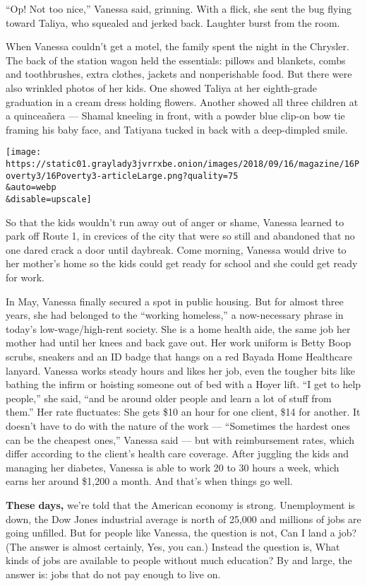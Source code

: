 ``Op! Not too nice,'' Vanessa said, grinning. With a flick, she sent the
bug flying toward Taliya, who squealed and jerked back. Laughter burst
from the room.

When Vanessa couldn't get a motel, the family spent the night in the
Chrysler. The back of the station wagon held the essentials: pillows and
blankets, combs and toothbrushes, extra clothes, jackets and
nonperishable food. But there were also wrinkled photos of her kids. One
showed Taliya at her eighth-grade graduation in a cream dress holding
flowers. Another showed all three children at a quinceañera --- Shamal
kneeling in front, with a powder blue clip-on bow tie framing his baby
face, and Tatiyana tucked in back with a deep-dimpled smile.

\texttt{[image: https://static01.graylady3jvrrxbe.onion/images/2018/09/16/magazine/16Poverty3/16Poverty3-articleLarge.png?quality=75\\\&auto=webp\\\&disable=upscale]}

So that the kids wouldn't run away out of anger or shame, Vanessa
learned to park off Route 1, in crevices of the city that were so still
and abandoned that no one dared crack a door until daybreak. Come
morning, Vanessa would drive to her mother's home so the kids could get
ready for school and she could get ready for work.

In May, Vanessa finally secured a spot in public housing. But for almost
three years, she had belonged to the ``working homeless,'' a
now-necessary phrase in today's low-wage/high-rent society. She is a
home health aide, the same job her mother had until her knees and back
gave out. Her work uniform is Betty Boop scrubs, sneakers and an ID
badge that hangs on a red Bayada Home Healthcare lanyard. Vanessa works
steady hours and likes her job, even the tougher bits like bathing the
infirm or hoisting someone out of bed with a Hoyer lift. ``I get to help
people,'' she said, ``and be around older people and learn a lot of
stuff from them.'' Her rate fluctuates: She gets \$10 an hour for one
client, \$14 for another. It doesn't have to do with the nature of the
work --- ``Sometimes the hardest ones can be the cheapest ones,''
Vanessa said --- but with reimbursement rates, which differ according to
the client's health care coverage. After juggling the kids and managing
her diabetes, Vanessa is able to work 20 to 30 hours a week, which earns
her around \$1,200 a month. And that's when things go well.

\textbf{These days,} we're told that the American economy is strong.
Unemployment is down, the Dow Jones industrial average is north of
25,000 and millions of jobs are going unfilled. But for people like
Vanessa, the question is not, Can I land a job? (The answer is almost
certainly, Yes, you can.) Instead the question is, What kinds of jobs
are available to people without much education? By and large, the answer
is: jobs that do not pay enough to live on.

